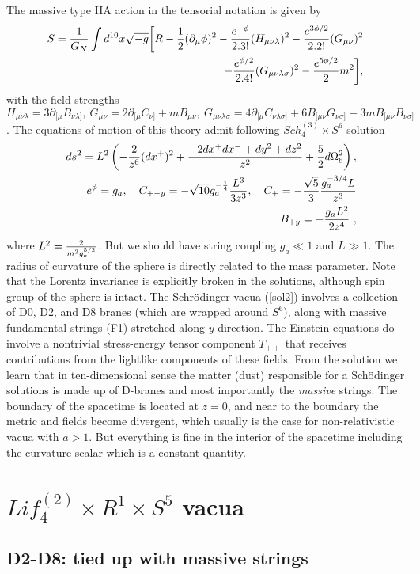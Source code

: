 \documentclass[12pt]{article}
\def\bea{\begin{eqnarray}} \def\eea{\end{eqnarray}} \def\ba{\begin{array}}
\newcommand{\eqn}[1]{(\ref{#1})}
\def\l{\lambda}\def\L{\Lambda}
\def\m{\mu}
\def\n{\nu}
\def\br{\nonumber\\}
\begin{document}
The massive type IIA action in the tensorial notation is given by
\bea\label{eq2l}
S={1\over G_N}\int d^{10}x \sqrt{-g}\bigg[ R- {1\over2} 
(\partial_\m\phi)^2 
-{e^{-\phi}\over 2.3!} (H_{\m\n\l})^2  
-{e^{3\phi/2}\over 2.2!} (G_{\m\n})^2 \br  
-{e^{\phi/2}\over 2.4!} (G_{\m\n\l\sigma })^2  
-{e^{5\phi/2}\over 2} m^2 \bigg],
\eea
with the field strengths $H_{\m\n\l}=3\partial_{[\m} B_{\n\l ]},~ 
G_{\m\n}=2\partial_{[\m}C_{\n]} + m B_{\m\n} ,~
G_{\m\n\l\sigma}=4\partial_{[\m} C_{\n\l\sigma ]}+ 6
B_{[\m\n}G_{\n\sigma ]} -
3{m}B_{[\m\n}B_{\n\sigma ]}$.
The equations of motion of this theory admit following
  $Sch_4^{(3)}\times S^6$ solution \cite{Singh:2009tq}
\bea\label{sol2}
&&ds^2=L^2\left(-{2\over z^{6}} 
(dx^{+})^2+{-2dx^{+}dx^{-}+dy^2+dz^2\over
z^2}  +{5\over 2} d\Omega_6^2 \right) ,\br
&&e^\phi=g_a, ~~~C_{+-y}= -\sqrt{10}  g_a^{-{1\over 4}} {L^3\over 3 z^3}, 
~~~C_{+}= -{\sqrt{5}\over 3}{ g_a^{-3/4}L\over  z^3} \br
&& 
B_{+ y}=  -{g_a L^2\over 2z^4} \ ,
\eea 
 where $L^2={2\over  m^2 g_a^{5/2}}$. But we should have string coupling
$g_a \ll 1$ and $L\gg 1$.
The radius of curvature of the sphere is directly related to the mass parameter.
Note that the Lorentz invariance is explicitly broken in the solutions, although 
spin group of the sphere is  intact. The Schr\"odinger vacua \eqn{sol2}  
involves a collection of D0, D2, and 
D8 branes (which are wrapped around $S^6$), along with massive 
fundamental strings (F1) stretched along  $y$ direction.  
The Einstein equations do
 involve a nontrivial stress-energy tensor component
$T_{++}$ that  receives contributions from the 
lightlike  components of these fields. 
From the solution we learn that in ten-dimensional sense
the  matter  (dust) responsible for a Sch\"odinger 
solutions is  made up of D-branes and most importantly
the {\it massive}  strings. 
The boundary of the spacetime is located at $z=0$, and near to
the boundary 
the metric and fields become divergent, which usually is the case for
non-relativistic vacua with $a>1$. But everything is fine in 
the interior of the spacetime including the curvature scalar 
which is a constant quantity. 

\section{$Lif_4^{(2)} \times R^1 \times S^5$ vacua}
\subsection{D2-D8: tied up with massive strings}
\end{document}
